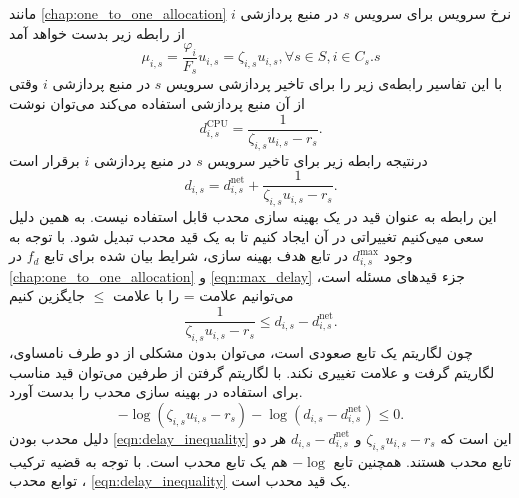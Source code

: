     مانند \cref{chap:one_to_one_allocation} نرخ سرویس برای سرویس $s$ در منبع پردازشی $i$ از رابطه زیر بدست خواهد آمد
    \begin{equation}
      \mu_{i,s} = \frac{\varphi_i}{F_s} u_{i,s} = \zeta_{i,s} u_{i,s}, \forall s \in S, i \in C_s.s
    \end{equation}
    با این تفاسیر رابطه‌ی زیر را برای تاخیر پردازشی سرویس $s$ در منبع پردازشی $i$ وقتی از آن منبع پردازشی استفاده می‌کند می‌توان نوشت
    \begin{equation}
      d_{i,s}^\text{CPU} = \frac{1}{\zeta_{i,s} u_{i,s} - r_s}.
    \end{equation}
    درنتیجه رابطه زیر برای تاخیر سرویس $s$ در منبع پردازشی $i$ برقرار است
    \begin{equation}
      d_{i,s} = d_{i,s}^\text{net} + \frac{1}{\zeta_{i,s} u_{i,s} - r_s}.
    \end{equation}
    این رابطه به عنوان قید در یک بهینه سازی محدب قابل استفاده نیست.
    به همین دلیل سعی میی‌کنیم تغییراتی در آن ایجاد کنیم تا به یک قید محدب تبدیل شود.
    با توجه به وجود $d_{i,s}^\text{max}$ در تابع هدف بهینه سازی، شرایط بیان شده برای تابع $f_d$ در \cref{chap:one_to_one_allocation} و \cref{eqn:max_delay} جزء قید‌های مسئله است، می‌توانیم علامت = را با علامت $\le$ جایگزین کنیم
    \begin{equation}
      \frac{1}{\zeta_{i,s} u_{i,s} - r_s} \le d_{i,s} - d_{i,s}^\text{net}.
    \end{equation}
    چون لگاریتم یک تابع صعودی است، می‌توان بدون مشکلی از دو طرف نامساوی، لگاریتم گرفت و علامت تغییری نکند.
    با لگاریتم گرفتن از طرفین می‌توان قید مناسب برای استفاده در بهینه سازی محدب را بدست آورد.
    \begin{equation}\label{eqn:delay_inequality}
      - \log (\zeta_{i,s} u_{i,s} - r_s) - \log (d_{i,s} - d_{i,s}^\text{net}) \le 0.
    \end{equation}
    دلیل محدب بودن \cref{eqn:delay_inequality} این است که $\zeta_{i,s} u_{i,s} - r_s$ و $d_{i,s} - d_{i,s}^\text{net}$ هر دو تابع محدب هستند.
    همچنین تابع $-\log$ هم یک تابع محدب است.
    با توجه به قضیه ترکیب توابع محدب \cite{boyd2004convex}، \cref{eqn:delay_inequality} یک قید محدب است.

